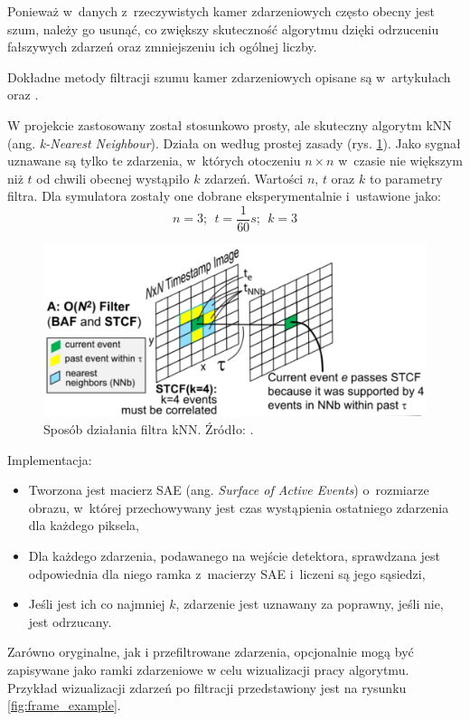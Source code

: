Ponieważ w~danych z~rzeczywistych kamer zdarzeniowych często obecny jest szum, należy go usunąć, co zwiększy skuteczność algorytmu dzięki odrzuceniu fałszywych zdarzeń oraz zmniejszeniu ich ogólnej liczby.

Dokładne metody filtracji szumu kamer zdarzeniowych opisane są w~artykułach \cite{dba_filter} oraz \cite{denoising}.

W projekcie zastosowany został stosunkowo prosty, ale skuteczny algorytm kNN (ang. \textit{k-Nearest Neighbour}). Działa on według prostej zasady (rys. \ref{fig:kNN}). Jako sygnał uznawane są tylko te zdarzenia, w~których otoczeniu $n \times n$ w~czasie nie większym niż $t$ od chwili obecnej wystąpiło $k$ zdarzeń. Wartości $n$, $t$ oraz $k$ to parametry filtra. Dla symulatora zostały one dobrane eksperymentalnie i~ustawione jako:
$$n=3; ~~t=\frac{1}{60}s; ~~k=3$$

\begin{figure}
    \centering
    \includegraphics[width=0.7\linewidth]{images/kNN.png}
    \caption{Sposób działania filtra kNN. Źródło: \cite{denoising}.}
    \label{fig:kNN}
\end{figure}

Implementacja:
\begin{itemize}
    \item Tworzona jest macierz SAE (ang. \textit{Surface of Active Events}) o~rozmiarze obrazu, w~której przechowywany jest czas wystąpienia ostatniego zdarzenia dla każdego piksela,
    \item Dla każdego zdarzenia, podawanego na wejście detektora, sprawdzana jest odpowiednia dla niego ramka z~macierzy SAE i~liczeni są jego sąsiedzi,
    \item Jeśli jest ich co najmniej $k$, zdarzenie jest uznawany za poprawny, jeśli nie, jest odrzucany.
\end{itemize}

Zarówno oryginalne, jak i przefiltrowane zdarzenia, opcjonalnie mogą być zapisywane jako ramki zdarzeniowe w celu wizualizacji pracy algorytmu. Przykład wizualizacji zdarzeń po filtracji przedstawiony jest na rysunku \ref{fig:frame_example}.

